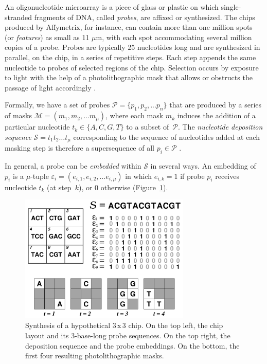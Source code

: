 \documentclass[english]{lni}
\begin{document}
An oligonucleotide microarray is a piece of glass or plastic on which
single-stranded fragments of DNA, called \emph{probes}, are affixed or
synthesized. The chips produced by Affymetrix, for instance, can contain more
than one million spots (or \emph{features}) as small as 11 $\mu$m, with each
spot accommodating several million copies of a probe. Probes are typically 25
nucleotides long and are synthesized in parallel, on the chip, in a series of
repetitive steps. Each step appends the same nucleotide to probes of selected
regions of the chip. Selection occurs by exposure to light with the help of a
photolithographic mask that allows or obstructs the passage of light
accordingly \cite{FODOR91}.

Formally, we have a set of probes $\mathcal{P} = \{p_{1}, p_{2}, ... p_{n}\}$
that are produced by a series of masks
$\mathcal{M} = (m_{1}, m_{2}, ... m_{\mu})$, where each mask $m_{k}$ induces the
addition of a particular nucleotide $t_{k} \in \{A, C, G, T\}$ to a subset
of~$\mathcal{P}$. The \emph{nucleotide deposition sequence}
$\mathcal{S} = t_{1} t_{2} \ldots t_{\mu}$ corresponding to the sequence of
nucleotides added at each masking step is therefore a supersequence of all
$p_{i} \in \mathcal{P}$ \cite{RAHMANN03}.

In general, a probe can be \emph{embedded} within $\mathcal{S}$ in several ways.
An embedding of $p_{i}$ is a $\mu$-tuple
$\varepsilon_{i} = (e_{i,1}, e_{i,2}, ... e_{i,\mu})$ in which $e_{i,k} = 1$ if
probe $p_{i}$ receives nucleotide $t_{k}$ (at step~$k$), or 0 otherwise
(Figure~\ref{fig:masking_process}).

\begin{figure}
\centerline{\includegraphics[width=230pt]{chip}}
\caption{Synthesis of a hypothetical 3\,x\,3 chip. On the top left, the chip
layout and its 3-base-long probe sequences. On the top right, the deposition
sequence and the probe embeddings. On the bottom, the first four resulting
photolithographic masks.}
\label{fig:masking_process}
\end{figure}
\end{document}
